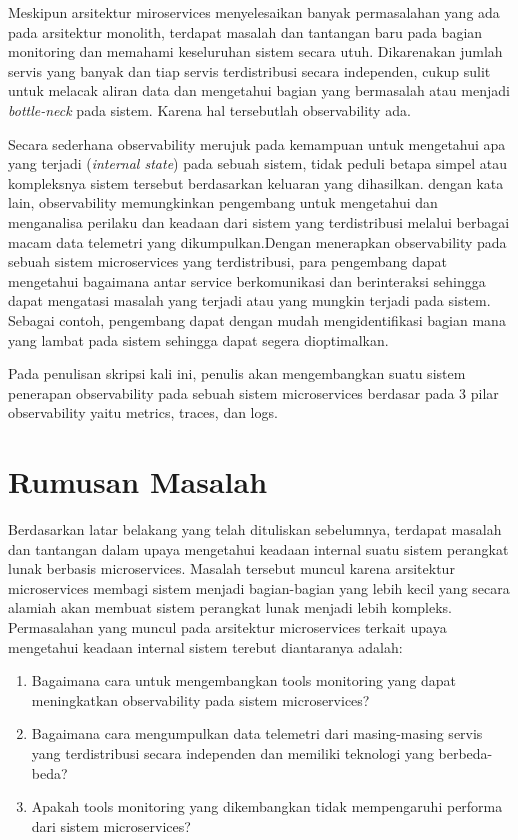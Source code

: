 Meskipun arsitektur miroservices menyelesaikan banyak permasalahan yang ada pada arsitektur monolith, terdapat masalah dan tantangan baru pada bagian monitoring dan memahami keseluruhan sistem secara utuh. Dikarenakan jumlah servis yang banyak dan tiap servis terdistribusi secara independen, cukup sulit untuk melacak aliran data dan mengetahui bagian yang bermasalah atau menjadi \emph{bottle-neck} pada sistem. Karena hal tersebutlah observability ada.

Secara sederhana observability merujuk pada kemampuan untuk mengetahui apa yang terjadi (\emph{internal state}) pada sebuah sistem, tidak peduli betapa simpel atau kompleksnya sistem tersebut berdasarkan keluaran yang dihasilkan. dengan kata lain, observability memungkinkan pengembang untuk mengetahui dan menganalisa perilaku dan keadaan dari sistem yang terdistribusi melalui berbagai macam data telemetri yang dikumpulkan.Dengan menerapkan observability pada sebuah sistem microservices yang terdistribusi, para pengembang dapat mengetahui bagaimana antar service berkomunikasi dan berinteraksi sehingga dapat mengatasi masalah yang terjadi atau yang mungkin terjadi pada sistem. Sebagai contoh, pengembang dapat dengan mudah mengidentifikasi bagian mana yang lambat pada sistem sehingga dapat segera dioptimalkan.

Pada penulisan skripsi kali ini, penulis akan mengembangkan suatu sistem penerapan observability pada sebuah sistem microservices berdasar pada 3 pilar observability yaitu metrics, traces, dan logs.

\section{Rumusan Masalah}
Berdasarkan latar belakang yang telah dituliskan sebelumnya, terdapat masalah dan tantangan dalam upaya mengetahui keadaan internal suatu sistem perangkat lunak berbasis microservices. Masalah tersebut muncul karena arsitektur microservices membagi sistem menjadi bagian-bagian yang lebih kecil yang secara alamiah akan membuat sistem perangkat lunak menjadi lebih kompleks. Permasalahan yang muncul pada arsitektur microservices terkait upaya mengetahui keadaan internal sistem terebut diantaranya adalah:
\begin{enumerate}
\item Bagaimana cara untuk mengembangkan tools monitoring yang dapat meningkatkan observability pada sistem microservices?
\item Bagaimana cara mengumpulkan data telemetri dari masing-masing servis yang terdistribusi secara independen dan memiliki teknologi yang berbeda-beda?
\item Apakah tools monitoring yang dikembangkan tidak mempengaruhi performa dari sistem microservices?
\end{enumerate}


